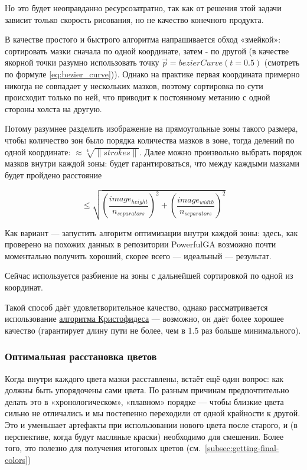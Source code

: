 Но это будет неоправданно ресурсозатратно, так как от решения этой задачи зависит только скорость рисования, но не качество конечного продукта.

В качестве простого и быстрого алгоритма напрашивается обход «змейкой»: сортировать мазки сначала по одной координате, затем - по другой
(в качестве якорной точки разумно использовать точку $\vec{p} = bezierCurve(t = 0.5)$ (смотреть по формуле \ref{eq:bezier_curve})).
Однако на практике первая координата примерно никогда не совпадает у нескольких мазков, поэтому сортировка по сути происходит только по ней,
что приводит к постоянному метанию с одной стороны холста на другую.

Потому разумнее разделить изображение на прямоугольные зоны такого размера,
чтобы количество зон было порядка количества мазков в зоне, тогда делений по одной координате: $\approx \sqrt[4]{\lVert strokes \rVert}$.
Далее можно произвольно выбрать порядок мазков внутри каждой зоны: будет гарантироваться, что между каждыми мазками будет пройдено расстояние

\begin{equation}\label{eq:movement_restriction}
    \leq \sqrt{\left( \frac{image_{height}}{n_{separators}} \right)^2 + \left( \frac{image_{width}}{n_{separators}} \right)^2}
\end{equation}

Как вариант — запустить алгоритм оптимизации внутри каждой зоны: здесь, как проверено на похожих данных в репозитории PowerfulGA
возможно почти моментально получить хороший, скорее всего — идеальный — результат.

Сейчас используется разбиение на зоны с дальнейшей сортировкой по одной из координат.

Такой способ даёт удовлетворительное качество, однако рассматривается использование
\href{https://en.wikipedia.org/wiki/Christofides_algorithm}{алгоритма Кристофидеса} —
возможно, он даёт более хорошее качество (гарантирует длину пути не более, чем в 1.5 раз больше минимального).

\subsubsection{Оптимальная расстановка цветов}\label{subsubsec:color-sequence}

Когда внутри каждого цвета мазки расставлены, встаёт ещё один вопрос: как должны быть упорядочены сами цвета.
По разным причинам предпочтительно делать это в «хронологическом», «плавном» порядке — чтобы близкие цвета
сильно не отличались и мы постепенно переходили от одной крайности к другой.
Это и уменьшает артефакты при использовании нового цвета после старого,
и (в перспективе, когда будут масляные краски) необходимо для смешения.
Более того, это полезно для получения итоговых цветов (см.~\ref{subsec:getting-final-colors})

